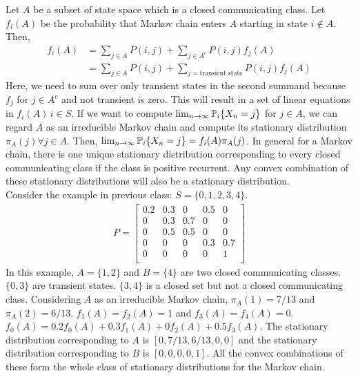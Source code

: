 \documentclass[all-lectures.tex]{subfiles}
\begin{document}
Let $A$ be a subset of state space which is a closed communicating class. Let $f_i(A)$ be the probability that Markov chain enters $A$ starting in state $i\notin A$. Then, 
\begin{align*}
f_i(A) &= \sum_{j\in A} P(i,j) + \sum_{j\in A^c} P(i,j) f_j(A) \\
&= \sum_{j\in A} P(i,j) + \sum_{j = \text{transient state}} P(i,j) f_j(A)
\end{align*}
Here, we need to sum over only transient states in the second summand because $f_j$ for $j \in A^c$ and not transient is zero. This will result in a set of linear equations in $f_i(A)\, i\in S$. If we want to compute $\lim_{n\rightarrow \infty}\P_i\{X_n = j\}$ for $j \in A$, we can regard $A$ as an irreducible Markov chain and compute its stationary distribution $\pi_A(j) \forall j \in A$. Then, $\lim_{n\rightarrow \infty}\P_i\{X_n = j\} = f_i(A) \pi_A(j)$. 
In general for a Markov chain, there is one unique stationary distribution corresponding to every closed communicating class if the class is positive recurrent. Any convex combination of these stationary distributions will also be a stationary distribution. \\
\indent Consider the example in previous class: $S = \{0,1,2,3,4\}$.
\begin{align*}
	P = 
\begin{bmatrix}
	0.2      & 0.3 & 0 & 0.5 & 0  \\
    0      & 0.3 & 0.7 & 0 & 0 \\
	0      & 0.5 & 0.5 & 0 & 0  \\
   0      & 0 & 0 & 0.3 & 0.7  \\
    0      & 0 & 0 & 0 & 1 \\
\end{bmatrix}
\end{align*}
In this example, $A=\{1,2\}$ and $B= \{4\}$ are two closed communicating classes. $\{0,3\}$  are transient states. $\{3,4\}$ is a closed set but not a closed communicating class. Considering $A$ as an irreducible Markov chain, $\pi_A(1) = 7/13$ and $\pi_A(2) = 6/13$. $f_1(A) = f_2(A) = 1$ and $f_3(A) = f_4(A) = 0$. $f_0(A) = 0.2 f_0(A) + 0.3 f_1(A) + 0 f_2(A) + 0.5 f_3(A)$. The stationary distribution corresponding to $A$ is $[0, 7/13, 6/13, 0, 0]$ and the stationary distribution corresponding to $B$ is $[0, 0, 0, 0, 1]$. All the convex combinations of these form the whole class of stationary distributions for the Markov chain. 
\end{document}

